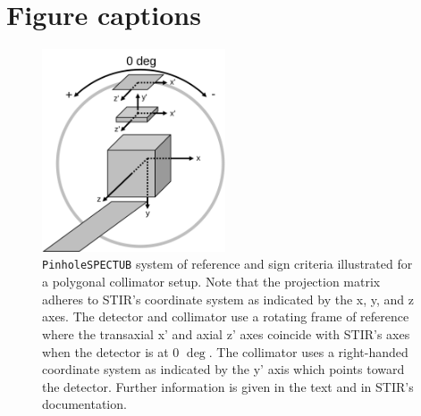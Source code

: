 \documentclass[utf8]{FrontiersinVancouver}
\begin{document}
\section*{Figure captions}


\begin{figure}[ht!]
\begin{center}
\includegraphics[height=6cm]{Figures/STIR-UsersGuide_PinholeSPECTUB}
\end{center}
\caption{\texttt{PinholeSPECTUB} system of reference and sign criteria illustrated for a polygonal collimator setup. Note that the projection matrix adheres to STIR's coordinate system as indicated by the x, y, and z axes. The detector and collimator use a rotating frame of reference where the transaxial x' and axial z' axes coincide with STIR's axes when the detector is at 0 $\mathrm{\deg}$. The collimator uses a right-handed coordinate system as indicated by the y' axis which points toward the detector. Further information is given in the text and in STIR's documentation.}
\label{fig:PinholeSPECTUB_coords}
\end{figure}
\end{document}
